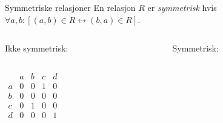 \begin{frame}[fragile]{Symmetriske relasjoner}
    En relasjon $R$ er \emph{symmetrisk} hvis $\forall a, b : [(a, b) \in R \leftrightarrow (b, a) \in R]$.\\
    \begin{columns}
        \begin{column}{0.3\textwidth}
            Ikke symmetrisk:\\
        \end{column}
        \pause
        \begin{column}{0.3\textwidth}
            Symmetrisk:\\
        \end{column}
    \end{columns}
    \pause
    \begin{columns}
        \begin{column}{0.3\textwidth}
            \begin{math}
                \begin{matrix}
                      & a & b & c & d\\
                    a & 0 & 0 & 1 & 0\\
                    b & 0 & 0 & 0 & 0\\
                    c & 0 & 1 & 0 & 0\\
                    d & 0 & 0 & 0 & 1
                \end{matrix}

\end{math}
\end{column}
\end{columns}
\end{frame}
